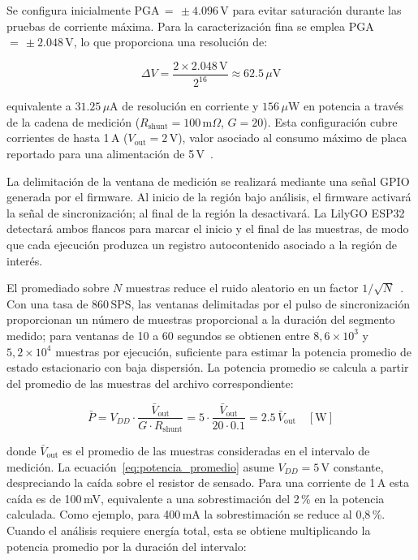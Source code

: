Se configura inicialmente PGA\,$=\,\pm 4.096$\,V para evitar saturación durante
las pruebas de corriente máxima. Para la caracterización fina se emplea
PGA\,$=\,\pm 2.048$\,V, lo que proporciona una resolución de:

\begin{equation}
    \Delta V = \frac{2 \times 2.048\,\text{V}}{2^{16}} \approx 62.5\,\mu\text{V}
    \label{eq:resolucion_adc}
\end{equation}

equivalente a $31.25\,\mu\text{A}$ de resolución en corriente y $156\,\mu\text{W}$
en potencia a través de la cadena de medición
($R_\text{shunt} = 100\,\text{m}\Omega$, $G = 20$). Esta configuración cubre corrientes de hasta 1\,A ($V_\text{out} = 2$\,V),
valor asociado al consumo máximo de placa reportado para una alimentación de
5\,V~\cite{nexysA7rm}.

La delimitación de la ventana de medición se realizará mediante una señal GPIO
generada por el firmware. Al inicio de la región bajo análisis, el firmware
activará la señal de sincronización; al final de la región la desactivará. La
LilyGO ESP32 detectará ambos flancos para marcar el inicio y el final de las muestras,
de modo que cada ejecución produzca un registro autocontenido asociado a la
región de interés.

El promediado sobre $N$ muestras reduce el ruido aleatorio en un factor
$1/\sqrt{N}$~\cite{ti_current_sensing,fang2021instruction}. Con una tasa de
$860\,\text{SPS}$, las ventanas delimitadas por el pulso de sincronización
proporcionan un número de muestras proporcional a la duración del segmento
medido; para ventanas de 10 a 60 segundos se obtienen entre
$8{,}6\!\times\!10^3$ y $5{,}2\!\times\!10^4$ muestras por ejecución,
suficiente para estimar la potencia promedio de estado estacionario con baja
dispersión. La potencia promedio se calcula a partir del promedio de las
muestras del archivo correspondiente:

\begin{equation}
    \bar{P} = V_{DD} \cdot \frac{\bar{V}_\text{out}}{G \cdot R_\text{shunt}}
            = 5 \cdot \frac{\bar{V}_\text{out}}{20 \cdot 0.1}
            = 2.5\,\bar{V}_\text{out} \quad [\text{W}]
    \label{eq:potencia_promedio}
\end{equation}

donde $\bar{V}_\text{out}$ es el promedio de las muestras consideradas en el
intervalo de medición. La ecuación~\ref{eq:potencia_promedio} asume
$V_{DD}=5\,\text{V}$ constante, despreciando la caída sobre el resistor de
sensado. Para una corriente de 1\,A esta caída es de 100\,mV,
equivalente a una sobrestimación del 2\,\% en la potencia calculada. Como
ejemplo, para 400\,mA la sobrestimación se reduce al
0{,}8\,\%. Cuando el análisis requiere energía total, esta se obtiene
multiplicando la potencia promedio por la duración del intervalo:

